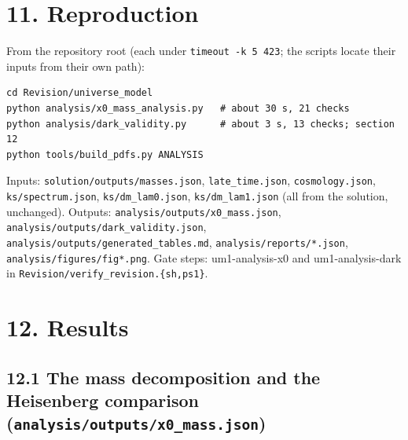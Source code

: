 \documentclass[11pt]{article}
\begin{document}
\section*{11. Reproduction}

From the repository root (each under \texttt{timeout -{}\allowbreak{}k 5 423}; the scripts locate their inputs from their own path):

\begin{Verbatim}[fontsize=\small]
cd Revision/universe_model
python analysis/x0_mass_analysis.py   # about 30 s, 21 checks
python analysis/dark_validity.py      # about 3 s, 13 checks; section 12
python tools/build_pdfs.py ANALYSIS
\end{Verbatim}

Inputs: \texttt{solution/\allowbreak{}outputs/\allowbreak{}masses.\allowbreak{}json}, \texttt{late\_\allowbreak{}time.\allowbreak{}json}, \texttt{cosmology.\allowbreak{}json}, \texttt{ks/\allowbreak{}spectrum.\allowbreak{}json}, \texttt{ks/\allowbreak{}dm\_\allowbreak{}lam0.\allowbreak{}json}, \texttt{ks/\allowbreak{}dm\_\allowbreak{}lam1.\allowbreak{}json} (all from the solution, unchanged). Outputs: \texttt{analysis/\allowbreak{}outputs/\allowbreak{}x0\_\allowbreak{}mass.\allowbreak{}json}, \texttt{analysis/\allowbreak{}outputs/\allowbreak{}dark\_\allowbreak{}validity.\allowbreak{}json}, \texttt{analysis/\allowbreak{}outputs/\allowbreak{}generated\_\allowbreak{}tables.\allowbreak{}md}, \texttt{analysis/\allowbreak{}reports/\allowbreak{}*.\allowbreak{}json}, \texttt{analysis/\allowbreak{}figures/\allowbreak{}fig*.\allowbreak{}png}. Gate steps: um1-analysis-x0 and um1-analysis-dark in \texttt{Revision/\allowbreak{}verify\_\allowbreak{}revision.\allowbreak{}\{sh,ps1\}}.

\section*{12. Results}

\subsection*{12.1 The mass decomposition and the Heisenberg comparison (\texttt{analysis/\allowbreak{}outputs/\allowbreak{}x0\_\allowbreak{}mass.\allowbreak{}json})}
\end{document}
